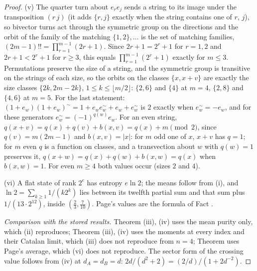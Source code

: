 \begin{proof}
(v) The quarter turn about $e_{r}e_{j}$ sends a string to its image under the transposition $(r\,j)$ (it adds $\{r,j\}$ exactly when the string contains one of $r$, $j$), so bivector turns act through the symmetric group on the directions and the orbit of the family of the matching $\{1,2\},\dots$ is the set of matching families, $(2m - 1)!! = \prod_{r=1}^{m-1}(2r + 1)$. Since $2r + 1 = 2^{r} + 1$ for $r = 1, 2$ and $2r + 1 < 2^{r} + 1$ for $r \ge 3$, this equals $\prod_{r=1}^{m-1}(2^{r} + 1)$ exactly for $m \le 3$. Permutations preserve the size of a string, and the symmetric group is transitive on the strings of each size, so the orbits on the classes $\{x, x + v\}$ are exactly the size classes $\{2k, 2m - 2k\}$, $1 \le k \le \lfloor m/2\rfloor$: $\{2, 6\}$ and $\{4\}$ at $m = 4$, $\{2, 8\}$ and $\{4, 6\}$ at $m = 5$. For the last statement: $(1 + e_{w})(1 + e_{w})^{\sim} = 1 + e_{w}e_{w}^{\sim} + e_{w} + e_{w}^{\sim}$ is $2$ exactly when $e_{w}^{\sim} = -e_{w}$, and for these generators $e_{w}^{\sim} = (-1)^{q(w)}e_{w}$. For an even string, $q(x + v) = q(x) + q(v) + b(x, v) = q(x) + m \pmod 2$, since $q(v) = m(2m - 1)$ and $b(x, v) = |x|$: for $m$ odd one of $x$, $x + v$ has $q = 1$; for $m$ even $q$ is a function on classes, and a transvection about $w$ with $q(w) = 1$ preserves it, $q(x + w) = q(x) + q(w) + b(x, w) = q(x)$ when $b(x,w) = 1$. For even $m \ge 4$ both values occur (sizes $2$ and $4$).

(vi) A flat state of rank $2^{e}$ has entropy $e\ln 2$; the means follow from (i), and $\ln 2 = \sum_{k \ge 1}1/(k2^{k})$ lies between its twelfth partial sum and that sum plus $1/(13 \cdot 2^{12})$, inside $(\tfrac23, \tfrac{7}{10})$. Page's values are the formula of Fact .

\emph{Comparison with the stored results.} Theorem (iii), (iv) uses the mean purity only, which (ii) reproduces; Theorem (iii), (iv) uses the moments at every index and their Catalan limit, which (iii) does not reproduce from $n = 4$; Theorem  uses Page's average, which (vi) does not reproduce. The sector form of the crossing value follows from (iv) at $d_{A} = d_{B} = d$: $2d/(d^{2} + 2) = (2/d)/(1 + 2d^{-2})$.
\end{proof}
